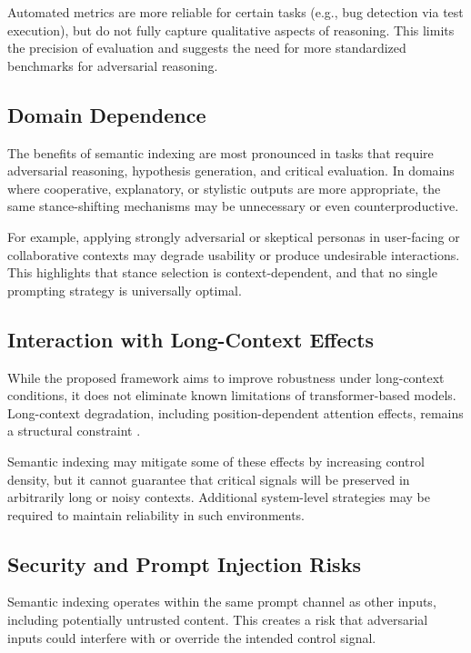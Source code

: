\documentclass[11pt]{article}
\begin{document}
Automated metrics are more reliable for certain tasks (e.g., bug detection via test execution), but do not fully capture qualitative aspects of reasoning. This limits the precision of evaluation and suggests the need for more standardized benchmarks for adversarial reasoning.

\subsection{Domain Dependence}

The benefits of semantic indexing are most pronounced in tasks that require adversarial reasoning, hypothesis generation, and critical evaluation. In domains where cooperative, explanatory, or stylistic outputs are more appropriate, the same stance-shifting mechanisms may be unnecessary or even counterproductive.

For example, applying strongly adversarial or skeptical personas in user-facing or collaborative contexts may degrade usability or produce undesirable interactions. This highlights that stance selection is context-dependent, and that no single prompting strategy is universally optimal.

\subsection{Interaction with Long-Context Effects}

While the proposed framework aims to improve robustness under long-context conditions, it does not eliminate known limitations of transformer-based models. Long-context degradation, including position-dependent attention effects, remains a structural constraint \cite{liu2023lostmiddle}.

Semantic indexing may mitigate some of these effects by increasing control density, but it cannot guarantee that critical signals will be preserved in arbitrarily long or noisy contexts. Additional system-level strategies may be required to maintain reliability in such environments.

\subsection{Security and Prompt Injection Risks}

Semantic indexing operates within the same prompt channel as other inputs, including potentially untrusted content. This creates a risk that adversarial inputs could interfere with or override the intended control signal.
\end{document}
